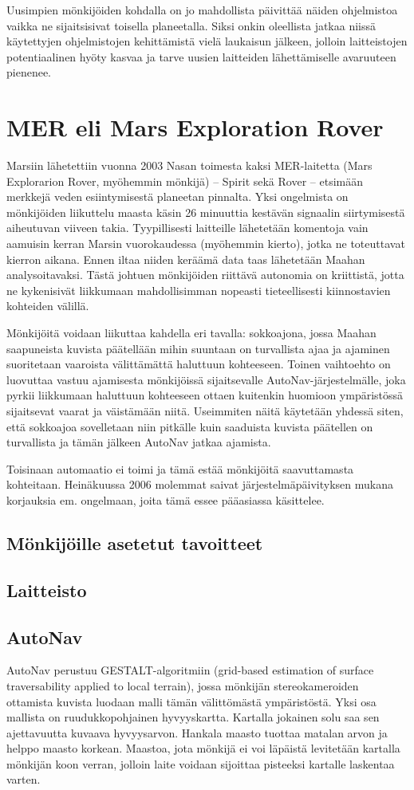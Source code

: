 \documentclass[finnish]{tktltiki2}
\theoremstyle{definition}
\theoremstyle{remark}
\begin{document}
Uusimpien mönkijöiden kohdalla on jo mahdollista päivittää näiden ohjelmistoa vaikka ne sijaitsisivat toisella planeetalla. Siksi onkin oleellista jatkaa niissä käytettyjen ohjelmistojen kehittämistä vielä laukaisun jälkeen, jolloin laitteistojen potentiaalinen hyöty kasvaa ja tarve uusien laitteiden lähettämiselle avaruuteen pienenee.

\section{MER eli Mars Exploration Rover}
Marsiin lähetettiin vuonna 2003 Nasan toimesta kaksi MER-laitetta (Mars Explorarion Rover, myöhemmin mönkijä) – Spirit sekä Rover – etsimään merkkejä veden esiintymisestä planeetan pinnalta. Yksi ongelmista on mönkijöiden liikuttelu maasta käsin 26 minuuttia kestävän signaalin siirtymisestä aiheutuvan viiveen takia. Tyypillisesti laitteille lähetetään komentoja vain aamuisin kerran Marsin vuorokaudessa (myöhemmin kierto), jotka ne toteuttavat kierron aikana. Ennen iltaa niiden keräämä data taas lähetetään Maahan analysoitavaksi. Tästä johtuen mönkijöiden riittävä autonomia on kriittistä, jotta ne kykenisivät liikkumaan mahdollisimman nopeasti tieteellisesti kiinnostavien kohteiden välillä.

Mönkijöitä voidaan liikuttaa kahdella eri tavalla: sokkoajona, jossa Maahan saapuneista kuvista päätellään mihin suuntaan on turvallista ajaa ja ajaminen suoritetaan vaaroista välittämättä haluttuun kohteeseen. Toinen vaihtoehto on luovuttaa vastuu ajamisesta mönkijöissä sijaitsevalle AutoNav-järjestelmälle, joka pyrkii liikkumaan haluttuun kohteeseen ottaen kuitenkin huomioon ympäristössä sijaitsevat vaarat ja väistämään niitä. Useimmiten näitä käytetään yhdessä siten, että sokkoajoa sovelletaan niin pitkälle kuin saaduista kuvista päätellen on turvallista ja tämän jälkeen AutoNav jatkaa ajamista.

Toisinaan automaatio ei toimi ja tämä estää mönkijöitä saavuttamasta kohteitaan. Heinäkuussa 2006 molemmat saivat järjestelmäpäivityksen mukana korjauksia em. ongelmaan, joita tämä essee pääasiassa käsittelee.
\subsection{Mönkijöille asetetut tavoitteet}
\subsection{Laitteisto}
\subsection{AutoNav}
AutoNav perustuu GESTALT-algoritmiin (grid-based estimation of surface traversability applied to local terrain), jossa mönkijän stereokameroiden ottamista kuvista luodaan malli tämän välittömästä ympäristöstä. Yksi osa mallista on ruudukkopohjainen hyvyyskartta. Kartalla jokainen solu saa sen ajettavuutta kuvaava hyvyysarvon. Hankala maasto tuottaa matalan arvon ja helppo maasto korkean. Maastoa, jota mönkijä ei voi läpäistä levitetään kartalla mönkijän koon verran, jolloin laite voidaan sijoittaa pisteeksi kartalle laskentaa varten.
\end{document}
